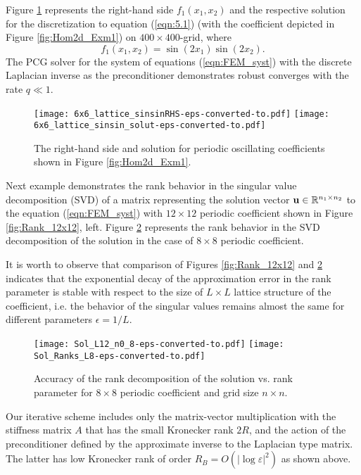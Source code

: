 \documentclass[amstex,amstext,amsfonts,epsf,12pt] {amsart}
\begin{document}
Figure \ref{fig:Hom2d_Sol1} represents the right-hand side $f_1(x_1,x_2)$ 
and the respective solution for 
the discretization to equation (\ref{eqn:5.1}) (with the coefficient depicted in Figure 
\ref{fig:Hom2d_Exm1}) on $400 \times 400$-grid, where
\[
 f_1(x_1,x_2) = \sin(2x_1) \sin(2 x_2). %
\]
The PCG solver for the system of equations (\ref{eqn:FEM_syst}) with the 
discrete Laplacian inverse 
as the preconditioner demonstrates robust converges with the rate $q\ll 1$.
\begin{figure}[htbp]
\centering
\texttt{[image: 6x6\_lattice\_sinsinRHS-eps-converted-to.pdf]}\quad
\texttt{[image: 6x6\_lattice\_sinsin\_solut-eps-converted-to.pdf]}
\caption{\small The right-hand side and solution for periodic oscillating coefficients shown 
in Figure \ref{fig:Hom2d_Exm1}.}
\label{fig:Hom2d_Sol1}  
\end{figure}
Next example demonstrates the rank behavior in the singular value decomposition (SVD) 
of a matrix 
representing the solution vector ${\bf u}\in \mathbb{R}^{n_1\times n_2}$ 
to the equation (\ref{eqn:FEM_syst})
with $12\times 12$ periodic coefficient shown in Figure \ref{fig:Rank_12x12}, left.
Figure \ref{fig:Rank_8x8} represents the rank behavior in the SVD decomposition of 
the solution in the case of $8 \times 8$ periodic coefficient. 

It is worth to observe that comparison of Figures \ref{fig:Rank_12x12} and \ref{fig:Rank_8x8} 
indicates that the exponential decay of the approximation error in the rank 
parameter is stable with respect to the size of $L \times L$ lattice structure of 
the coefficient, i.e. the behavior of the singular values remains almost the 
same for different parameters $\epsilon=1/L$.

\begin{figure}[htbp]
\centering
\texttt{[image: Sol\_L12\_n0\_8-eps-converted-to.pdf]}
\texttt{[image: Sol\_Ranks\_L8-eps-converted-to.pdf]}
\caption{\small Accuracy of the rank decomposition of the solution vs. rank parameter 
for $8\times 8$ periodic coefficient and grid size $n\times n$.}
\label{fig:Rank_8x8} 
\end{figure}

Our iterative scheme includes only the matrix-vector multiplication with the 
stiffness matrix $A$ that has the small Kronecker rank $2R$, and the 
action of the preconditioner
defined by the approximate inverse to the Laplacian type matrix. The latter has low 
Kronecker rank of order $R_B=O(|\log \varepsilon |^2)$ as shown above.
\end{document}
